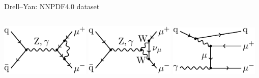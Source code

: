 \begin{frame}{Drell--Yan: NNPDF4.0 dataset}
\fontsize{9}{11}\selectfont
\begin{columns}[T,onlytextwidth]
\begin{column}{.5\textwidth}

\centering
\includegraphics[width=0.32\textwidth]{ew_corrections/figures/fd04_loop_vertex_correction}
\includegraphics[width=0.32\textwidth]{ew_corrections/figures/fd07_loop_vertex_w_bosons}
\includegraphics[width=0.32\textwidth]{ew_corrections/figures/fd06_photon_quark_real}

\vspace*{0.4cm}



\end{column}
\end{columns}
\end{frame}
